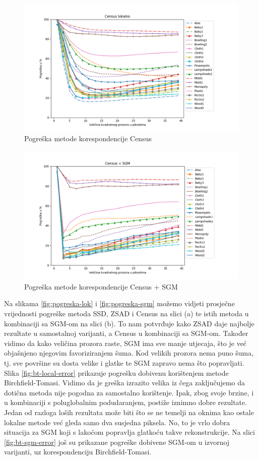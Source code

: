 \documentclass[utf8, zavrsni, numeric]{fer}
\begin{document}
\begin{figure}[H]
  \centering
  \includegraphics[width=13cm]{img/Census_lokalno_middlebury.png}
  \caption{Pogreška metode korespondencije Census}
  \label{fig:Census-error}
\end{figure}

\begin{figure}[H]
  \centering
  \includegraphics[width=13cm]{img/Census_sgm_middlebury.png}
  \caption{Pogreška metode korespondencije Census + SGM}
  \label{fig:Census-sgm-error}
\end{figure}

Na slikama \ref{fig:pogreska-lok} i \ref{fig:pogreska-sgm} možemo vidjeti prosječne vrijednosti pogreške metoda SSD, ZSAD i Census na
slici (a) te istih metoda u kombinaciji sa SGM-om na slici (b). To nam potvrđuje kako ZSAD
daje najbolje rezultate u samostalnoj varijanti, a Census u kombinaciji sa SGM-om.
Također vidimo da kako veličina prozora raste, SGM ima sve manje utjecaja, što je već objašnjeno
njegovim favoriziranjem šuma. Kod velikih prozora nema puno šuma, tj. sve površine su dosta velike i glatke te SGM zapravo nema što popravljati. Slika \ref{fig:bt-local-error} prikazuje pogrešku dobivenu korištenjem metode Birchfield-Tomasi.
Vidimo da je greška izrazito velika iz čega zaključujemo da dotična metoda nije pogodna za samostalno korištenje. Ipak, zbog svoje brzine, i u kombinaciji s poluglobalnim podudaranjem, postiže iznimno dobre rezultate. Jedan od razloga loših rezultata može biti što se ne temelji na oknima kao ostale lokalne metode već gleda samo dva susjedna piksela. No, to je vrlo dobra situacija za SGM koji s lakoćom popravlja glatkoću takve rekonstrukcije. Na slici \ref{fig:bt-sgm-error} još su
prikazane pogreške dobivene SGM-om u izvornoj varijanti, uz korespondenciju Birchfield-Tomasi.
\end{document}
